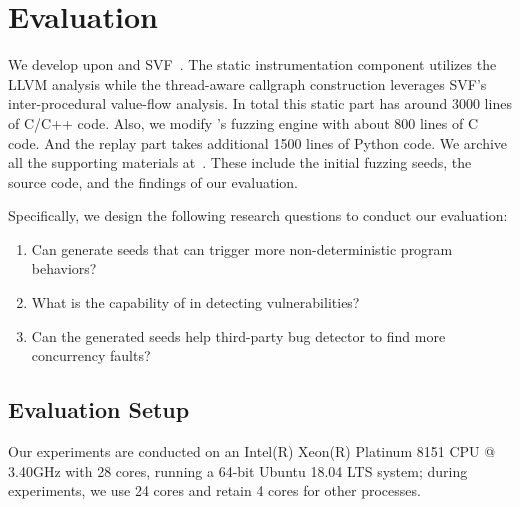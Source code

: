  
\section{Evaluation}

We develop \mtfuzz upon \FOT and SVF~\cite{Sui:2016:SVF,DBLP:conf/ppopp/DiS16,DBLP:conf/cgo/SuiDX16}. 
The static instrumentation component utilizes the LLVM analysis while the 
thread-aware callgraph construction leverages SVF's inter-procedural value-flow 
analysis. In total this static part has around 3000 lines of C/C++ code. Also, 
we modify \FOT's fuzzing engine with about 800 lines of C code. And the replay part 
takes additional 1500 lines of Python code. We archive all the supporting materials 
at~\cite{mtfuzz-webpage}. These include the initial 
fuzzing seeds, the source code, and the findings of our evaluation.

Specifically, we design the following research questions to conduct our evaluation:
\begin{enumerate}[{\bf RQ1}]
    \item Can \mtfuzz generate seeds that can trigger more non-deterministic 
			program behaviors?
    \item What is the capability of \mtfuzz in detecting vulnerabilities?
    \item Can the generated seeds help third-party bug detector to find more 
			concurrency faults?
\end{enumerate}

\subsection{Evaluation Setup}
Our experiments are conducted on an Intel(R) Xeon(R) Platinum
8151 CPU @ 3.40GHz with 28 cores, running a 64-bit Ubuntu 18.04
LTS system; during experiments, we use 24 cores and retain 4 cores
for other processes.

